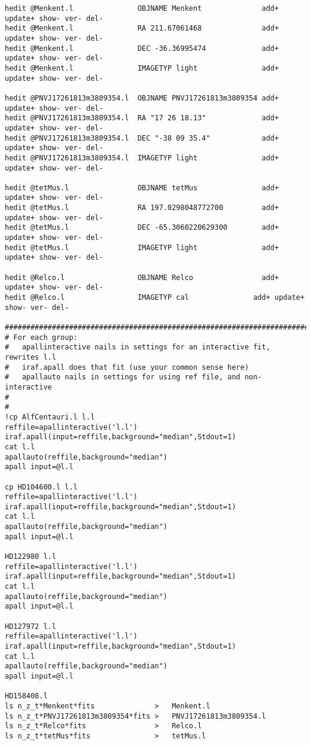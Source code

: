 \begin{verbatim}
hedit @Menkent.l               OBJNAME Menkent              add+ update+ show- ver- del- 
hedit @Menkent.l               RA 211.67061468              add+ update+ show- ver- del-
hedit @Menkent.l               DEC -36.36995474             add+ update+ show- ver- del-
hedit @Menkent.l               IMAGETYP light               add+ update+ show- ver- del-

hedit @PNVJ17261813m3809354.l  OBJNAME PNVJ17261813m3809354 add+ update+ show- ver- del- 
hedit @PNVJ17261813m3809354.l  RA "17 26 18.13"             add+ update+ show- ver- del-
hedit @PNVJ17261813m3809354.l  DEC "-38 09 35.4"            add+ update+ show- ver- del-
hedit @PNVJ17261813m3809354.l  IMAGETYP light               add+ update+ show- ver- del-

hedit @tetMus.l                OBJNAME tetMus               add+ update+ show- ver- del-
hedit @tetMus.l                RA 197.0298048772700         add+ update+ show- ver- del-
hedit @tetMus.l                DEC -65.3060220629300        add+ update+ show- ver- del-
hedit @tetMus.l                IMAGETYP light               add+ update+ show- ver- del-

hedit @Relco.l                 OBJNAME Relco                add+ update+ show- ver- del- 
hedit @Relco.l                 IMAGETYP cal               add+ update+ show- ver- del-

#############################################################################
# For each group:
#   apallinteractive nails in settings for an interactive fit, rewrites l.l
#   iraf.apall does that fit (use your common sense here)
#   apallauto nails in settings for using ref file, and non-interactive 
# 
# 
!cp AlfCentauri.l l.l
reffile=apallinteractive('l.l')
iraf.apall(input=reffile,background="median",Stdout=1)
cat l.l
apallauto(reffile,background="median")
apall input=@l.l

cp HD104600.l l.l
reffile=apallinteractive('l.l')
iraf.apall(input=reffile,background="median",Stdout=1)
cat l.l
apallauto(reffile,background="median")
apall input=@l.l

HD122980 l.l
reffile=apallinteractive('l.l')
iraf.apall(input=reffile,background="median",Stdout=1)
cat l.l
apallauto(reffile,background="median")
apall input=@l.l

HD127972 l.l
reffile=apallinteractive('l.l')
iraf.apall(input=reffile,background="median",Stdout=1)
cat l.l
apallauto(reffile,background="median")
apall input=@l.l

HD158408.l
ls n_z_t*Menkent*fits              >   Menkent.l
ls n_z_t*PNVJ17261813m3809354*fits >   PNVJ17261813m3809354.l
ls n_z_t*Relco*fits                >   Relco.l
ls n_z_t*tetMus*fits               >   tetMus.l                


\end{verbatim}
